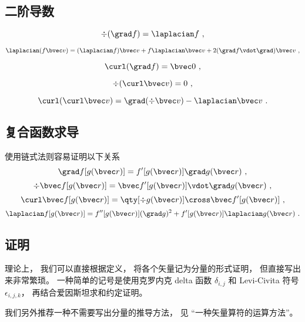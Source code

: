 \subsection{二阶导数}

\begin{equation}
\div (\grad f) = \laplacian f~,
\end{equation}

\begin{equation}\label{eq_VopEq_5}
\laplacian (f \bvec v) = (\laplacian f)\bvec v + f \laplacian \bvec v + 2 (\grad f \vdot \grad) \bvec v~,
\end{equation}

\begin{equation}
\curl (\grad f) = \bvec 0~,
\end{equation}

\begin{equation}
\div (\curl \bvec v) = 0~,
\end{equation}

\begin{equation}\label{eq_VopEq_7}
\curl(\curl \bvec v) = \grad(\div\bvec v) - \laplacian \bvec v~.
\end{equation}

\subsection{复合函数求导}
使用链式法则容易证明以下关系
\begin{equation}
\grad f[g(\bvec r)] = f'[g(\bvec r)] \grad g(\bvec r)~,
\end{equation}
\begin{equation}
\div \bvec f[g(\bvec r)] = \bvec f'[g(\bvec r)] \vdot \grad g(\bvec r)~,
\end{equation}
\begin{equation}
\curl \bvec f[g(\bvec r)] = \qty[\div g(\bvec r)] \cross \bvec f'[g(\bvec r)]~,
\end{equation}
\begin{equation}
\laplacian f[g(\bvec r)] = f''[g(\bvec r)] (\grad g)^2 + f'[g(\bvec r)] \laplacian g(\bvec r)~.
\end{equation}

\subsection{证明}
理论上， 我们可以直接根据定义， 将各个矢量记为分量的形式证明， 但直接写出来非常繁琐。 一种简单的记号是使用克罗内克 delta 函数 $\delta_{i,j}$ 和 Levi-Civita 符号 $\epsilon_{i,j,k}$， 再结合爱因斯坦求和约定证明。

我们另外推荐一种不需要写出分量的推导方法， 见 “一种矢量算符的运算方法”。
